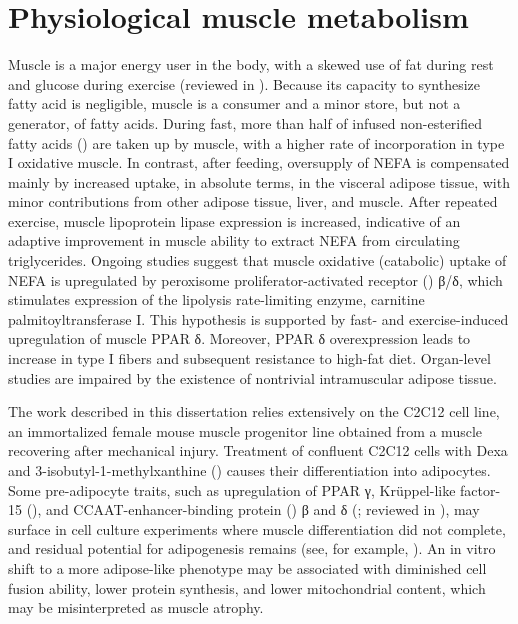 \documentclass[12pt,english]{report}\usepackage[]{graphicx}\usepackage[]{color}
\begin{document}
\section{Physiological muscle metabolism}

Muscle is a major energy user in the body, with a skewed use of fat
during rest and glucose during exercise (reviewed in \citep{berg2002each,wasserman2009four}).
Because its capacity to synthesize fatty acid is negligible, muscle
is a consumer and a minor store, but not a generator, of fatty acids.
During fast, more than half of infused non-esterified fatty acids
() are taken up by
muscle, with a higher rate of incorporation in type I oxidative muscle\citep{li1995triglyceride}.
In contrast, after feeding, oversupply of NEFA is compensated mainly
by increased uptake, in absolute terms, in the visceral adipose tissue,
with minor contributions from other adipose tissue, liver, and muscle.
After repeated exercise, muscle lipoprotein lipase expression is increased,
indicative of an adaptive improvement in muscle ability to extract
NEFA from circulating triglycerides\citep{seip1997induction}. Ongoing
studies suggest that muscle oxidative (catabolic) uptake of NEFA is
upregulated by peroxisome proliferator-activated receptor ()
β/δ, which stimulates expression of the lipolysis rate-limiting enzyme,
carnitine palmitoyltransferase I\citep{wang2003peroxisome-proliferator-activated,narkar2008ampk}.
This hypothesis is supported by fast- and exercise-induced upregulation
of muscle PPAR δ\citep{watt2004suppression,holst2003nutritional}.
Moreover, PPAR δ overexpression leads to increase in type I fibers
and subsequent resistance to high-fat diet\citep{wang2003peroxisome-proliferator-activated}.
Organ-level studies are impaired by the existence of nontrivial intramuscular
adipose tissue.

The work described in this dissertation relies extensively on the
C2C12 cell line, an immortalized female mouse muscle progenitor line
obtained from a muscle recovering after mechanical injury. Treatment
of confluent C2C12 cells with Dexa and 3-isobutyl-1-methylxanthine
() causes their differentiation
into adipocytes\citep{mancini2007fmip}. Some pre-adipocyte traits,
such as upregulation of PPAR γ, Krüppel-like factor-15 (),
and CCAAT-enhancer-binding protein ()
β and δ (\citep{mori2005role}; reviewed in \citep{cristancho2011forming}),
may surface in cell culture experiments where muscle differentiation
did not complete, and residual potential for adipogenesis remains
(see, for example, \citep{itoigawa2010hypoxia}). An in vitro shift
to a more adipose-like phenotype may be associated with diminished
cell fusion ability, lower protein synthesis, and lower mitochondrial
content, which may be misinterpreted as muscle atrophy.
\end{document}
